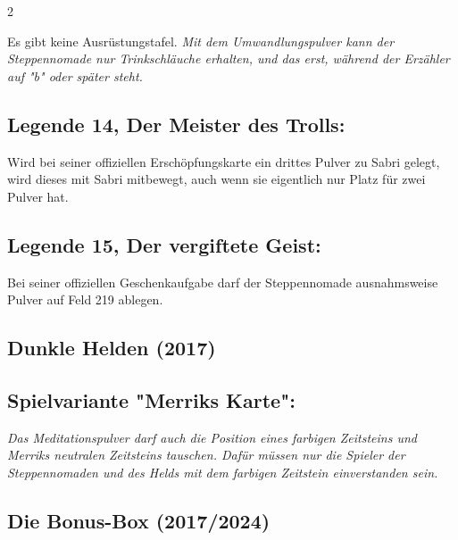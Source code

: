 \documentclass[10pt, a4paper, oneside]{book}
\newcommand{\fan}[1]{\textit{#1}}
\begin{document}
\begin{multicols*}{2}
\begin{bgcolor}
Es gibt keine Ausrüstungstafel. \fan{Mit dem Umwandlungspulver kann der Steppennomade nur Trinkschläuche erhalten, und das erst, während der Erzähler auf "b" oder später steht.}





\subsection{Legende 14, Der Meister des Trolls:}

Wird bei seiner offiziellen Erschöpfungskarte ein drittes Pulver zu Sabri gelegt, wird dieses mit Sabri mitbewegt, auch wenn sie eigentlich nur Platz für zwei Pulver hat.
\supercite{94521}


\subsection{Legende 15, Der vergiftete Geist:}

Bei seiner offiziellen Geschenkaufgabe darf der Steppennomade ausnahmsweise Pulver auf Feld 219 ablegen.

\end{bgcolor}



\begin{nobgcolor}

\section{Dunkle Helden (2017)}

\subsection{Spielvariante "Merriks Karte":}

\fan{Das Meditationspulver darf auch die Position eines farbigen Zeitsteins und Merriks neutralen Zeitsteins tauschen. Dafür müssen nur die Spieler der Steppennomaden und des Helds mit dem farbigen Zeitstein einverstanden sein.}

\end{nobgcolor}


\columnbreak




\begin{bgcolor}[color-BB]
\section{Die Bonus-Box (2017/2024)}



\end{bgcolor}
\end{multicols*}
\end{document}
